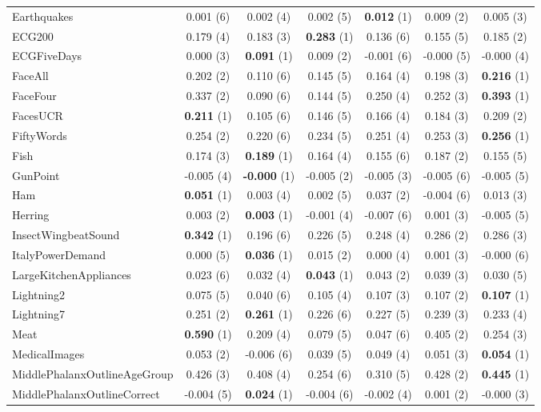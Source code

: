 \begin{table}[ht]
\begin{adjustbox}{width=\textwidth}
\begin{tabular}{lcccccc}
Earthquakes & 0.001 (6) & 0.002 (4) & 0.002 (5) & \textbf{0.012} (1) & 0.009 (2) & 0.005 (3) \\
ECG200 & 0.179 (4) & 0.183 (3) & \textbf{0.283} (1) & 0.136 (6) & 0.155 (5) & 0.185 (2) \\
ECGFiveDays & 0.000 (3) & \textbf{0.091} (1) & 0.009 (2) & -0.001 (6) & -0.000 (5) & -0.000 (4) \\
FaceAll & 0.202 (2) & 0.110 (6) & 0.145 (5) & 0.164 (4) & 0.198 (3) & \textbf{0.216} (1) \\
FaceFour & 0.337 (2) & 0.090 (6) & 0.144 (5) & 0.250 (4) & 0.252 (3) & \textbf{0.393} (1) \\
FacesUCR & \textbf{0.211} (1) & 0.105 (6) & 0.146 (5) & 0.166 (4) & 0.184 (3) & 0.209 (2) \\
FiftyWords & 0.254 (2) & 0.220 (6) & 0.234 (5) & 0.251 (4) & 0.253 (3) & \textbf{0.256} (1) \\
Fish & 0.174 (3) & \textbf{0.189} (1) & 0.164 (4) & 0.155 (6) & 0.187 (2) & 0.155 (5) \\
GunPoint & -0.005 (4) & \textbf{-0.000} (1) & -0.005 (2) & -0.005 (3) & -0.005 (6) & -0.005 (5) \\
Ham & \textbf{0.051} (1) & 0.003 (4) & 0.002 (5) & 0.037 (2) & -0.004 (6) & 0.013 (3) \\
Herring & 0.003 (2) & \textbf{0.003} (1) & -0.001 (4) & -0.007 (6) & 0.001 (3) & -0.005 (5) \\
InsectWingbeatSound & \textbf{0.342} (1) & 0.196 (6) & 0.226 (5) & 0.248 (4) & 0.286 (2) & 0.286 (3) \\
ItalyPowerDemand & 0.000 (5) & \textbf{0.036} (1) & 0.015 (2) & 0.000 (4) & 0.001 (3) & -0.000 (6) \\
LargeKitchenAppliances & 0.023 (6) & 0.032 (4) & \textbf{0.043} (1) & 0.043 (2) & 0.039 (3) & 0.030 (5) \\
Lightning2 & 0.075 (5) & 0.040 (6) & 0.105 (4) & 0.107 (3) & 0.107 (2) & \textbf{0.107} (1) \\
Lightning7 & 0.251 (2) & \textbf{0.261} (1) & 0.226 (6) & 0.227 (5) & 0.239 (3) & 0.233 (4) \\
Meat & \textbf{0.590} (1) & 0.209 (4) & 0.079 (5) & 0.047 (6) & 0.405 (2) & 0.254 (3) \\
MedicalImages & 0.053 (2) & -0.006 (6) & 0.039 (5) & 0.049 (4) & 0.051 (3) & \textbf{0.054} (1) \\
MiddlePhalanxOutlineAgeGroup & 0.426 (3) & 0.408 (4) & 0.254 (6) & 0.310 (5) & 0.428 (2) & \textbf{0.445} (1) \\
MiddlePhalanxOutlineCorrect & -0.004 (5) & \textbf{0.024} (1) & -0.004 (6) & -0.002 (4) & 0.001 (2) & -0.000 (3) \\

\end{tabular}
\end{adjustbox}
\end{table}
